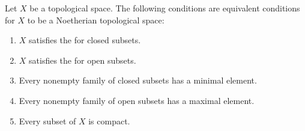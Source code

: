 \documentclass[12pt]{article}
\begin{document}

Let $X$ be a topological space.  The following conditions are equivalent conditions for $X$ to be a Noetherian topological space:

\begin{enumerate}
\item $X$ satisfies the  for closed subsets.
\item $X$ satisfies the  for open subsets.
\item Every nonempty family of closed subsets has a minimal element.
\item Every nonempty family of open subsets has a maximal element.
\item Every subset of $X$ is compact.
\end{enumerate}

\end{document}
